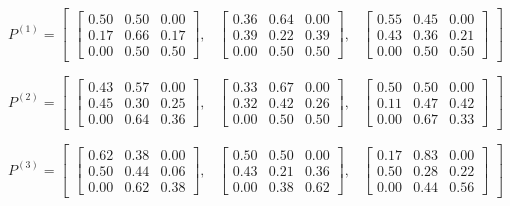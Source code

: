 \documentclass[twoside]{article}
\theoremstyle{plain}
\theoremstyle{definition}
\theoremstyle{remark}
\begin{document}
\begin{equation}
P^{(1)} =
\begin{bmatrix}
\begin{bmatrix} 0.50 & 0.50 & 0.00 \\ 0.17 & 0.66 & 0.17 \\ 0.00 & 0.50 & 0.50 \end{bmatrix}, &
\begin{bmatrix} 0.36 & 0.64 & 0.00 \\ 0.39 & 0.22 & 0.39 \\ 0.00 & 0.50 & 0.50 \end{bmatrix}, &
\begin{bmatrix} 0.55 & 0.45 & 0.00 \\ 0.43 & 0.36 & 0.21 \\ 0.00 & 0.50 & 0.50 \end{bmatrix}
\end{bmatrix}
\end{equation}

\begin{equation}
P^{(2)} =
\begin{bmatrix}
\begin{bmatrix} 0.43 & 0.57 & 0.00 \\ 0.45 & 0.30 & 0.25 \\ 0.00 & 0.64 & 0.36 \end{bmatrix}, &
\begin{bmatrix} 0.33 & 0.67 & 0.00 \\ 0.32 & 0.42 & 0.26 \\ 0.00 & 0.50 & 0.50 \end{bmatrix}, &
\begin{bmatrix} 0.50 & 0.50 & 0.00 \\ 0.11 & 0.47 & 0.42 \\ 0.00 & 0.67 & 0.33 \end{bmatrix}
\end{bmatrix}
\end{equation}

\begin{equation}
P^{(3)} =
\begin{bmatrix}
\begin{bmatrix} 0.62 & 0.38 & 0.00 \\ 0.50 & 0.44 & 0.06 \\ 0.00 & 0.62 & 0.38 \end{bmatrix}, &
\begin{bmatrix} 0.50 & 0.50 & 0.00 \\ 0.43 & 0.21 & 0.36 \\ 0.00 & 0.38 & 0.62 \end{bmatrix}, &
\begin{bmatrix} 0.17 & 0.83 & 0.00 \\ 0.50 & 0.28 & 0.22 \\ 0.00 & 0.44 & 0.56 \end{bmatrix}
\end{bmatrix}
\end{equation}
\end{document}

